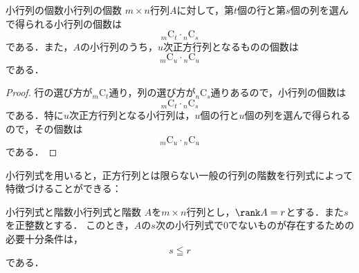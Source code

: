 \begin{prop}{小行列の個数}{小行列の個数}
  $m \times n$行列$A$に対して，第$t$個の行と第$s$個の列を選んで得られる小行列の個数は
  \[
  {}_m \mathrm{C}_t \cdot {}_n \mathrm{C}_s
  \]
  である．また，$A$の小行列のうち，$u$次正方行列となるものの個数は
  \[
  {}_m \mathrm{C}_u \cdot {}_n \mathrm{C}_u
  \]
  である．
\end{prop}

\begin{tleftbar}
\begin{proof}
  行の選び方が${}_m \mathrm{C}_t$通り，列の選び方が${}_n \mathrm{C}_s$通りあるので，小行列の個数は
  \[
  {}_m \mathrm{C}_t \cdot {}_n \mathrm{C}_s
  \]
  である．特に$u$次正方行列となる小行列は，$u$個の行と$u$個の列を選んで得られるので，その個数は
  \[
  {}_m \mathrm{C}_u \cdot {}_n \mathrm{C}_u
  \]
  である．
\end{proof}
\end{tleftbar}

小行列式を用いると，正方行列とは限らない一般の行列の階数を行列式によって特徴づけることができる：

\begin{prop}{小行列式と階数}{小行列式と階数}
  $A$を$m \times n$行列とし，$\rank A = r$とする．また$s$を正整数とする．
  このとき，$A$の$s$次の小行列式で$0$でないものが存在するための必要十分条件は，
  \[
  s \leqq r
  \]
  である．
\end{prop}

